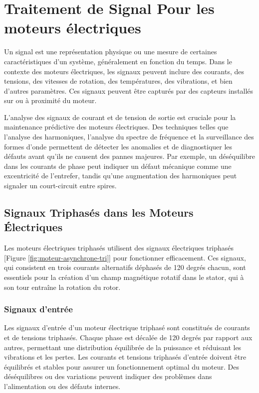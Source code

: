 
\section{Traitement de Signal Pour les moteurs électriques}

Un signal est une représentation physique ou une mesure de certaines
caractéristiques d’un système, généralement en fonction du temps. Dans le
contexte des moteurs électriques, les signaux peuvent inclure des courants, des
tensions, des vitesses de rotation, des températures, des vibrations, et bien
d'autres paramètres. Ces signaux peuvent être capturés par des capteurs
installés sur ou à proximité du moteur.

L'analyse des signaux de courant et de tension de sortie est cruciale pour la
maintenance prédictive des moteurs électriques. Des techniques telles que
l'analyse des harmoniques, l'analyse du spectre de fréquence et la surveillance
des formes d'onde permettent de détecter les anomalies et de diagnostiquer les
défauts avant qu'ils ne causent des pannes majeures. Par exemple, un
déséquilibre dans les courants de phase peut indiquer un défaut mécanique comme
une excentricité de l'entrefer, tandis qu'une augmentation des harmoniques peut
signaler un court-circuit entre spires.

\subsection{Signaux Triphasés dans les Moteurs Électriques}

Les moteurs électriques triphasés utilisent des signaux électriques triphasés
[Figure \ref{fig:moteur-asynchrone-tri}] pour fonctionner efficacement. Ces
signaux, qui consistent en trois courants alternatifs déphasés de 120 degrés
chacun, sont essentiels pour la création d'un champ magnétique rotatif dans le
stator, qui à son tour entraîne la rotation du rotor.

\subsubsection*{Signaux d'entrée}

Les signaux d'entrée d'un moteur électrique triphasé sont constitués de
courants et de tensions triphasés. Chaque phase est décalée de 120 degrés par
rapport aux autres, permettant une distribution équilibrée de la puissance et
réduisant les vibrations et les pertes. Les courants et tensions triphasés
d'entrée doivent être équilibrés et stables pour assurer un fonctionnement
optimal du moteur. Des déséquilibres ou des variations peuvent indiquer des
problèmes dans l'alimentation ou des défauts internes.


